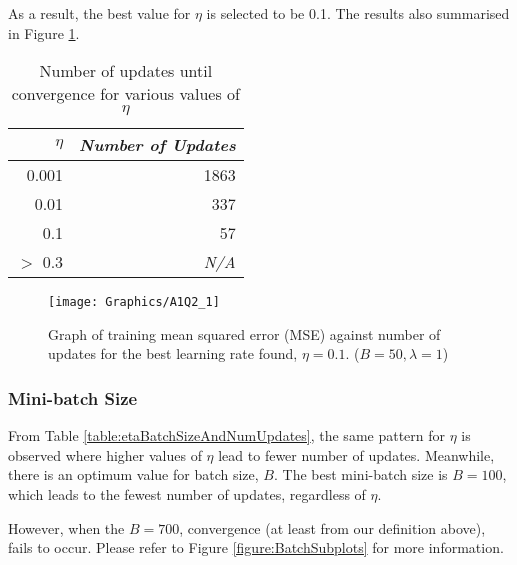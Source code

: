 \documentclass[a4paper,12pt]{article}
\begin{document}
As a result, the best value for $\eta$ is selected to be 0.1. The results also summarised in Figure \ref{figure:BestEta}.

\begin{table}[ht]
	\centering %
    \caption{Number of updates until convergence for various values of 
    	$\eta$} %
	\label{table:etaAndNumUpdates} %
    \vspace{1em}
	\begin{tabular}{r r}
		\hline %
		$\eta$ & \textit{Number of Updates} \\ 
        [0.5ex] 
		\hline
		0.001 & 1863 \\
		0.01 & 337 \\
		0.1 & 57 \\
        $>$ 0.3 & \textit{N/A} \\
        [1ex] %
		\hline %
	\end{tabular}
\end{table}
\begin{figure}[!htb]
	\centering
	\texttt{[image: Graphics/A1Q2\_1]}
    \caption{\label{figure:BestEta}Graph of training mean squared error
    	(MSE) against number of updates for the best learning rate found, 
    	$\eta = 0.1$. ($B = 50, \lambda = 1$)}
\end{figure}
\clearpage
\subsubsection{Mini-batch Size}
From Table \ref{table:etaBatchSizeAndNumUpdates}, the same pattern for $\eta$ is observed where higher values of $\eta$ lead to fewer number of updates. Meanwhile, there is an optimum value for batch size, $B$. The best mini-batch size is $B = 100$, which leads to the fewest number of updates, regardless of $\eta$. 

However, when the $B = 700$, convergence (at least from our definition above), fails to occur. Please refer to Figure \ref{figure:BatchSubplots} for more information.
\end{document}
